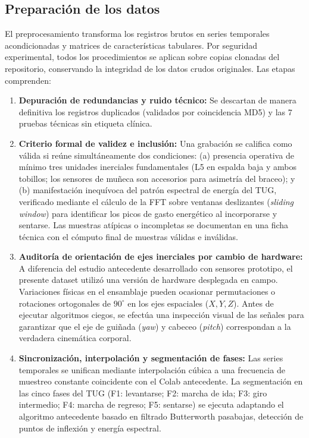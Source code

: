 \documentclass[12pt,a4paper]{article}
\begin{document}
\subsection{Preparación de los datos}\label{sec:met-preparacion}

El preprocesamiento transforma los registros brutos en series temporales acondicionadas y matrices de características tabulares. Por seguridad experimental, todos los procedimientos se aplican sobre copias clonadas del repositorio, conservando la integridad de los datos crudos originales. Las etapas comprenden:

\begin{enumerate}[itemsep=3pt]
  \item \textbf{Depuración de redundancias y ruido técnico:} Se descartan de manera definitiva los registros duplicados (validados por coincidencia MD5) y las 7 pruebas técnicas sin etiqueta clínica.
  \item \textbf{Criterio formal de validez e inclusión:} Una grabación se califica como válida si reúne simultáneamente dos condiciones: (a) presencia operativa de mínimo tres unidades inerciales fundamentales (L5 en espalda baja y ambos tobillos; los sensores de muñeca son accesorios para asimetría del braceo); y (b) manifestación inequívoca del patrón espectral de energía del TUG, verificado mediante el cálculo de la FFT sobre ventanas deslizantes (\emph{sliding window}) para identificar los picos de gasto energético al incorporarse y sentarse. Las muestras atípicas o incompletas se documentan en una ficha técnica con el cómputo final de muestras válidas e inválidas.
  \item \textbf{Auditoría de orientación de ejes inerciales por cambio de hardware:} A diferencia del estudio antecedente desarrollado con sensores prototipo, el presente dataset utilizó una versión de hardware desplegada en campo. Variaciones físicas en el ensamblaje pueden ocasionar permutaciones o rotaciones ortogonales de $90^\circ$ en los ejes espaciales ($X, Y, Z$). Antes de ejecutar algoritmos ciegos, se efectúa una inspección visual de las señales para garantizar que el eje de guiñada (\emph{yaw}) y cabeceo (\emph{pitch}) correspondan a la verdadera cinemática corporal.
  \item \textbf{Sincronización, interpolación y segmentación de fases:} Las series temporales se unifican mediante interpolación cúbica a una frecuencia de muestreo constante coincidente con el Colab antecedente. La segmentación en las cinco fases del TUG (F1: levantarse; F2: marcha de ida; F3: giro intermedio; F4: marcha de regreso; F5: sentarse) se ejecuta adaptando el algoritmo antecedente basado en filtrado Butterworth pasabajas, detección de puntos de inflexión y energía espectral.

\end{enumerate}
\end{document}
